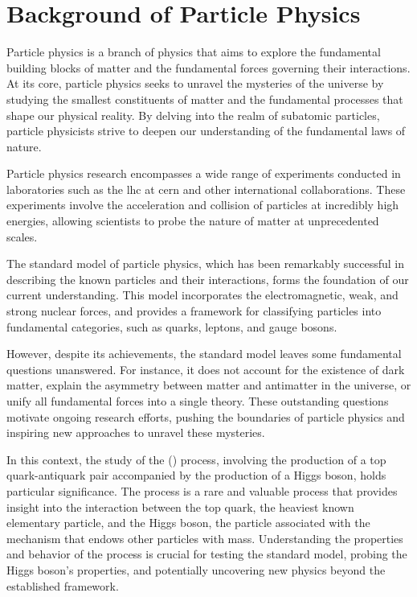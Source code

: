 \section*{Background of Particle Physics}


Particle physics is a branch of physics that aims to explore the fundamental building blocks of matter and the
fundamental forces governing their interactions. At its core, particle physics seeks to unravel the mysteries of the
universe by studying the smallest constituents of matter and the fundamental processes that shape our physical reality.
By delving into the realm of subatomic particles, particle physicists strive to deepen our understanding of the
fundamental laws of nature.

Particle physics research encompasses a wide range of experiments conducted in laboratories such as the \gls{lhc} at
\gls{cern} and other international collaborations. These experiments involve the acceleration and collision of particles
at incredibly high energies, allowing scientists to probe the nature of matter at unprecedented scales.

The standard model of particle physics, which has been remarkably successful in describing the known particles and their
interactions, forms the foundation of our current understanding. This model incorporates the electromagnetic, weak, and
strong nuclear forces, and provides a framework for classifying particles into fundamental categories, such as quarks,
leptons, and gauge bosons.

However, despite its achievements, the standard model leaves some fundamental questions unanswered. For instance, it
does not account for the existence of dark matter, explain the asymmetry between matter and antimatter in the universe,
or unify all fundamental forces into a single theory. These outstanding questions motivate ongoing research efforts,
pushing the boundaries of particle physics and inspiring new approaches to unravel these mysteries.

In this context, the study of the \ttH () process, involving the production of a top
quark-antiquark pair accompanied by the production of a Higgs boson, holds particular significance. The \ttH process is
a rare and valuable process that provides insight into the interaction between the top quark, the heaviest known
elementary particle, and the Higgs boson, the particle associated with the mechanism that endows other particles with
mass. Understanding the properties and behavior of the \ttH process is crucial for testing the standard model, probing
the Higgs boson's properties, and potentially uncovering new physics beyond the established framework.

